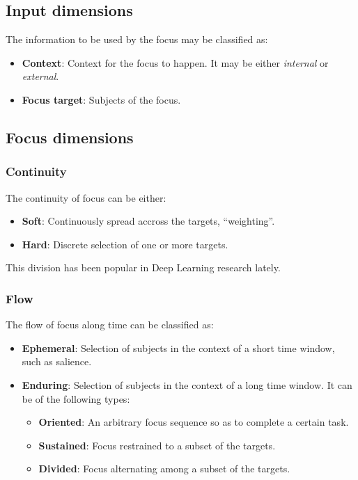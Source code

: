 \documentclass[11pt]{article}
\begin{document}
\subsection{Input dimensions}
The information to be used by the focus may be classified as:
\begin{itemize}
    \item \textbf{Context}: Context for the focus to happen. It may be either \emph{internal} or \emph{external}.
    \item \textbf{Focus target}: Subjects of the focus.
\end{itemize}

\subsection{Focus dimensions}
\subsubsection{Continuity}
The continuity of focus can be either:
\begin{itemize}
    \item \textbf{Soft}: Continuously spread accross the targets, ``weighting''.
    \item \textbf{Hard}: Discrete selection of one or more targets.
\end{itemize}
This division has been popular in Deep Learning research lately.

\subsubsection{Flow}
The flow of focus along time can be classified as:
\begin{itemize}
    \item \textbf{Ephemeral}: Selection of subjects in the context of a short time window, such as salience.
    \item \textbf{Enduring}: Selection of subjects in the context of a long time window. It can be of the following types:
    \begin{itemize}
        \item \textbf{Oriented}: An arbitrary focus sequence so as to complete a certain task.
        \item \textbf{Sustained}: Focus restrained to a subset of the targets.
        \item \textbf{Divided}: Focus alternating among a subset of the targets.
    \end{itemize}
\end{itemize}
\end{document}

